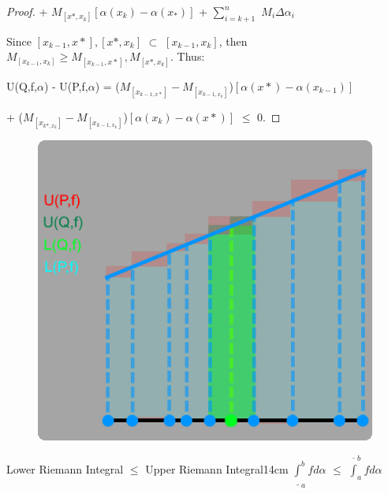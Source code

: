 \begin{proof}
        \hspace{5.2cm}
        + $M_{[x*,x_k]} [\alpha(x_k) - \alpha(x_*)]$
        + $\sum_{i=k+1}^n$ $M_i \Delta \alpha_i$

        \hspace{0.5cm}
        Since $[x_{k-1},x*],[x*,x_k]$ $\subset$ $[x_{k-1},x_k]$, then
        $M_{[x_{k-1},x_k]} \geq M_{[x_{k-1},x*]}, M_{[x*,x_k]}$.
        Thus:

        \hspace{0.5cm}
        U(Q,f,$\alpha$) - U(P,f,$\alpha$)
        = ($M_{[x_{k-1,x*}]} - M_{[x_{k-1,x_k}]}$)$[\alpha(x*) - \alpha(x_{k-1})]$

        \hspace{4.5cm}
        + ($M_{[x_{k*,x_k}]} - M_{[x_{k-1,x_k}]}$)$[\alpha(x_k) - \alpha(x*)]$
        $\leq$ 0.
    \end{proof}



    \begin{figure}[h]
        \centering
        \includegraphics[scale=0.45]{Images/13.1.4.png}
    \end{figure}


    
    \begin{wtheorem}{Lower Riemann Integral $\leq$ Upper Riemann Integral}{14cm}
        $\underline{\int}_a^b f d \alpha$ $\leq$ $\overline{\int}_a^b f d \alpha$        
    \end{wtheorem}
    
